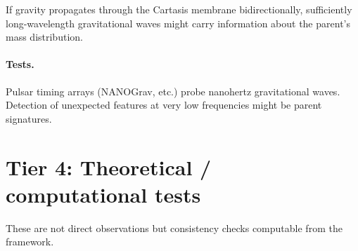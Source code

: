 If gravity propagates through the Cartasis membrane bidirectionally,
sufficiently long-wavelength gravitational waves might carry information about
the parent's mass distribution.
\paragraph{Tests.} Pulsar timing arrays (NANOGrav, etc.) probe nanohertz
gravitational waves. Detection of unexpected features at very low frequencies
might be parent signatures.

\section{Tier 4: Theoretical / computational tests}

These are not direct observations but consistency checks computable from the
framework.

